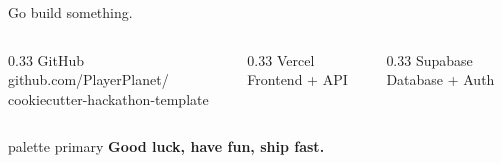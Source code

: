 \documentclass[10pt,aspectratio=169,t]{beamer}
\begin{document}
{
  \begin{frame}

    \centering
    \vspace{2cm}

    {\LARGE Go build something.}

    \vspace{2cm}

    \begin{columns}
      \begin{column}{0.33\paperwidth}\centering
        {\large GitHub}\\
        \vspace{0.3em}github.com/PlayerPlanet/\\
        cookiecutter-hackathon-template
      \end{column}
      \begin{column}{0.33\paperwidth}\centering
        {\large Vercel}\\
        \vspace{0.3em}Frontend + API
      \end{column}
      \begin{column}{0.33\paperwidth}\centering
        {\large Supabase}\\
        \vspace{0.3em}Database + Auth
      \end{column}
    \end{columns}

    \vspace{2cm}

    \begin{beamercolorbox}[wd=\paperwidth,center,ht=1cm,dp=0.5cm]{palette primary}
      \textbf{Good luck, have fun, ship fast.}
    \end{beamercolorbox}

  \end{frame}
}
\end{document}
